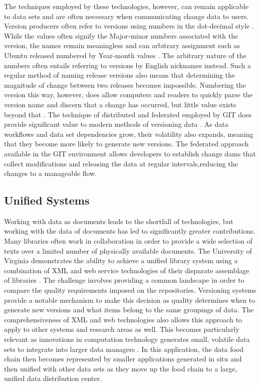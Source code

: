 The techniques employed by these technologies, however, can remain applicable to data sets and are often necessary when communicating change data to users.
Version producers often refer to versions using numbers in the dot-decimal style \cite{Stuckenholz:2005:CEV:1039174.1039197}.
While the values often signify the Major-minor numbers associated with the version, the names remain meaningless and can arbitrary assignment such as Ubuntu released numbered by Year-month values \cite{Ubuntu}.
The arbitrary nature of the numbers often entails referring to versions by English nicknames instead.
Such a regular method of naming release versions also means that determining the magnitude of change between two releases becomes impossible.
Numbering the version this way, however, does allow computers and readers to quickly parse the version name and discern that a change has occurred, but little value exists beyond that \cite{Dijkstra1994}.
The technique of distributed and federated employed by GIT does provide significant value to modern methods of versioning data \cite{cederqvist2002version}.
As data workflows and data set dependencies grow, their volatility also expands, meaning that they become more likely to generate new versions.
The federated approach available in the GIT environment allows developers to establish change dams that collect modifications and releasing the data at regular intervals,reducing the changes to a manageable flow.

\subsection{Unified Systems}

Working with data as documents leads to the shortfall of technologies, but working with the data of documents has led to significantly greater contributions.
Many libraries often work in collaboration in order to provide a wide selection of texts over a limited number of physically available documents.
The University of Virginia demonstrates the ability to achieve a unified library system using a combination of XML and web service technologies of their disparate assemblage of libraries \cite{Payette2002}.
The challenge involves providing a common landscape in order to compare the quality requirements imposed on the repositories.
Versioning systems provide a notable mechanism to make this decision as quality determines when to generate new versions and what items belong to the same groupings of data.
The comprehensiveness of XML and web technologies also allows this approach to apply to other systems and research areas as well.
This becomes particularly relevant as innovations in computation technology generates small, volatile data sets to integrate into larger data managers \cite{Baker2009}.
In this application, the data food chain then becomes represented by smaller applications generated in situ and then unified with other data sets as they move up the food chain to a large, unified data distribution center.

